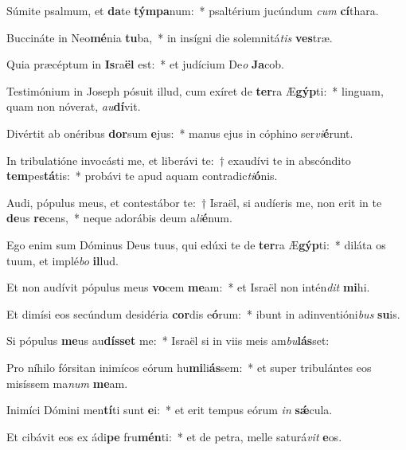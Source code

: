 \item Súmite psalmum, et \textbf{da}te \textbf{tým}\textbf{pa}num:~* psaltérium jucúndum \textit{cum} \textbf{cí}thara.
\item Buccináte in Neo\textbf{mé}nia \textbf{tu}ba,~* in insígni die solemnitá\textit{tis} \textbf{ves}træ.
\item Quia præcéptum in \textbf{Is}ra\textbf{ël} est:~* et judícium De\textit{o} \textbf{Ja}cob.
\item Testimónium in Joseph pósuit illud, cum exíret de \textbf{ter}ra Æ\textbf{gýp}ti:~* linguam, quam non nóverat, \textit{au}\textbf{dí}vit.
\item Divértit ab onéribus \textbf{dor}sum \textbf{e}jus:~* manus ejus in cóphino ser\textit{vi}\textbf{é}runt.
\item In tribulatióne invocásti me, et liberávi te:~† exaudívi te in abscóndito \textbf{tem}pes\textbf{tá}tis:~* probávi te apud aquam contradic\textit{ti}\textbf{ó}nis.
\item Audi, pópulus meus, et contestábor te:~† Israël, si audíeris me, non erit in te \textbf{de}us \textbf{re}cens,~* neque adorábis deum a\textit{li}\textbf{é}num.
\item Ego enim sum Dóminus Deus tuus, qui edúxi te de \textbf{ter}ra Æ\textbf{gýp}ti:~* diláta os tuum, et implé\textit{bo} \textbf{il}lud.
\item Et non audívit pópulus meus \textbf{vo}cem \textbf{me}am:~* et Israël non intén\textit{dit} \textbf{mi}hi.
\item Et dimísi eos secúndum desidéria \textbf{cor}dis e\textbf{ó}rum:~* ibunt in adinventióni\textit{bus} \textbf{su}is.
\item Si pópulus \textbf{me}us au\textbf{dís}\textbf{set} me:~* Israël si in viis meis am\textit{bu}\textbf{lás}set:
\item Pro níhilo fórsitan inimícos eórum hu\textbf{mi}li\textbf{ás}sem:~* et super tribulántes eos misíssem ma\textit{num} \textbf{me}am.
\item Inimíci Dómini men\textbf{tí}ti sunt \textbf{e}i:~* et erit tempus eórum \textit{in} \textbf{sǽ}cula.
\item Et cibávit eos ex ádi\textbf{pe} fru\textbf{mén}ti:~* et de petra, melle saturá\textit{vit} \textbf{e}os.
